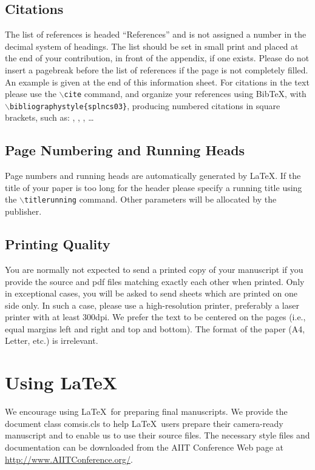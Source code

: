 \documentclass[runningheads]{AIIT}
\begin{document}
\subsection{Citations}

The list of references is headed ``References'' and is not assigned a number
in the decimal system of headings. The list should be set in small print and
placed at the end of your contribution, in front of the appendix, if one
exists. Please do not insert a pagebreak before the list of references if the
page is not completely filled. An example is given at the end of this
information sheet. For citations in the text please use the
\texttt{$\backslash$cite} command, and organize your references using Bib\TeX,
with \texttt{$\backslash$bibliographystyle\{splncs03\}}, producing numbered
citations in square brackets, such as: \cite{Agrawal94VLDB}, \cite{Enc97LNCS},
\cite{DatabaseBook02}, \dots

\subsection{Page Numbering and Running Heads}

Page numbers and running heads are automatically generated by \LaTeX. If the
title of your paper is too long for the header please specify a running title
using the \texttt{$\backslash$titlerunning} command. Other parameters will be
allocated by the publisher.

\subsection{Printing Quality}

You are normally not expected to send a printed copy of your manuscript if you
provide the source and pdf files matching exactly each other when printed.
Only in exceptional cases, you will be asked to send sheets which are printed
on one side only. In such a case, please use a high-resolution printer,
preferably a laser printer with at least 300dpi. We prefer the text to be
centered on the pages (i.e., equal margins left and right and top and bottom).
The format of the paper (A4, Letter, etc.) is irrelevant.


\section{Using \LaTeX}\label{sec:latex}

We encourage using \LaTeX\ for preparing final manuscripts. We provide the
document class comsis.cls to help \LaTeX\ users prepare their camera-ready
manuscript and to enable us to use their source files. The necessary style
files and documentation can be downloaded from the AIIT Conference Web page at
\url{http://www.AIITConference.org/}.
\end{document}
